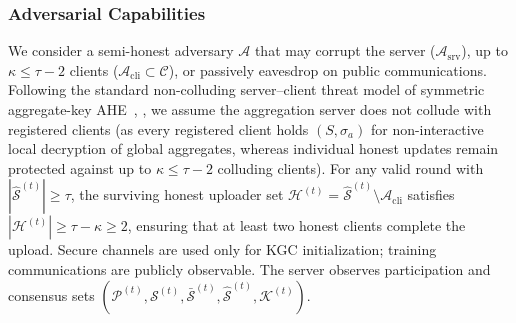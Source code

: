 \subsubsection{Adversarial Capabilities}
We consider a semi-honest adversary $\mathcal{A}$ that may
corrupt the server ($\mathcal{A}_{\mathrm{srv}}$), up to
$\kappa\le\tau-2$ clients ($\mathcal{A}_{\mathrm{cli}} \subset \mathcal{C}$),
or passively eavesdrop on public communications.
Following the standard non-colluding server--client threat model of symmetric aggregate-key AHE~\cite{wu2025esafl}, \cite{li2025fedphe}, we assume the aggregation server does not collude with registered clients (as every registered client holds $(S, \sigma_a)$ for non-interactive local decryption of global aggregates, whereas individual honest updates remain protected against up to $\kappa \le \tau - 2$ colluding clients).
For any valid round with
$|\widehat{\mathcal{S}}^{(t)}|\ge\tau$,
the surviving honest uploader set $\mathcal{H}^{(t)} = \widehat{\mathcal{S}}^{(t)} \setminus \mathcal{A}_{\mathrm{cli}}$ satisfies $|\mathcal{H}^{(t)}| \ge \tau - \kappa \ge 2$, ensuring that at least two honest clients complete the upload.
Secure channels are used only for KGC initialization;
training communications are publicly observable.
The server observes participation and consensus sets
$(\mathcal{P}^{(t)},\mathcal{S}^{(t)},
\bar{\mathcal{S}}^{(t)},\widehat{\mathcal{S}}^{(t)},
\mathcal{K}^{(t)})$.


